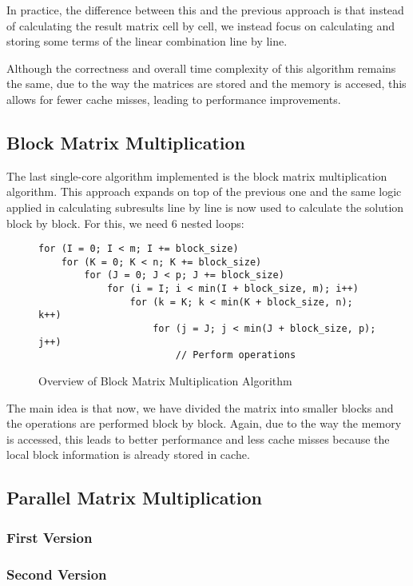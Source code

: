 In practice, the difference between this and the previous approach is that instead of calculating the result matrix cell by cell, we instead focus on calculating and storing some terms of the linear combination line by line.

Although the correctness and overall time complexity of this algorithm remains the same, due to the way the matrices are stored and the memory is accesed, this allows for fewer cache misses, leading to performance improvements.

\subsection{Block Matrix Multiplication}

The last single-core algorithm implemented is the block matrix multiplication algorithm. This approach expands on top of the previous one and the same logic applied in calculating subresults line by line is now used to calculate the solution block by block. For this, we need 6 nested loops:

\begin{figure}[h!]
\begin{verbatim}
for (I = 0; I < m; I += block_size)
    for (K = 0; K < n; K += block_size)
        for (J = 0; J < p; J += block_size)
            for (i = I; i < min(I + block_size, m); i++)
                for (k = K; k < min(K + block_size, n); k++)
                    for (j = J; j < min(J + block_size, p); j++)
                        // Perform operations
\end{verbatim}
\caption{Overview of Block Matrix Multiplication Algorithm}
\label{fig:algo:block}
\end{figure}

The main idea is that now, we have divided the matrix into smaller blocks and the operations are performed block by block. Again, due to the way the memory is accessed, this leads to better performance and less cache misses because the local block information is already stored in cache.

\subsection{Parallel Matrix Multiplication}

\subsubsection{First Version}

\subsubsection{Second Version}

